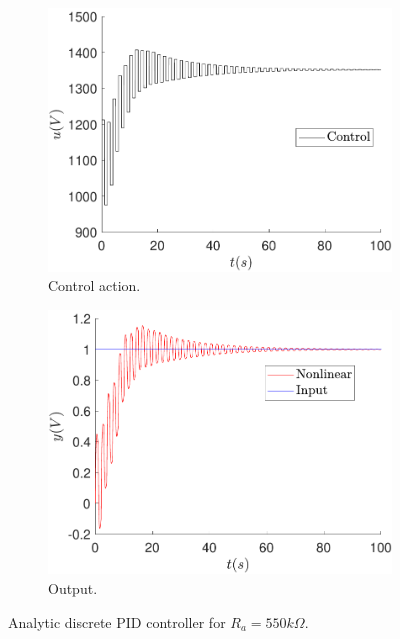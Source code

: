     \begin{figure}
        \centering
        \begin{subfigure}[b]{0.475\textwidth}
            \centering
            \includegraphics[scale=0.425]{files/sens_analysis/PID/control_analytic_a_550.pdf}
            \caption{Control action.}
        \end{subfigure}
        \vskip0.1cm
        \begin{subfigure}[b]{0.475\textwidth}   
            \centering 
            \includegraphics[scale=0.425]{files/sens_analysis/PID/analytic_sensitivity_a_550.pdf}
            \caption{Output.}
        \end{subfigure}
        \caption{Analytic discrete PID controller for $R_a=550k\Omega$.}
        \label{fig:sens_ra_550}
	\end{figure}
	
